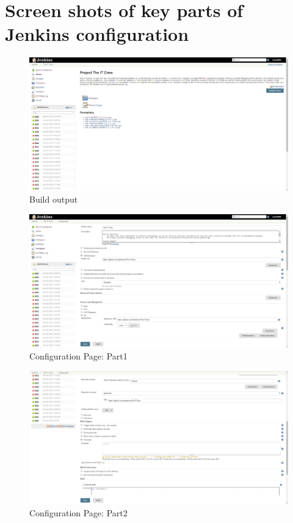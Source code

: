 \documentclass[UTF8]{article}
\begin{document}
\section{Screen shots of key parts of Jenkins configuration}
\begin{figure}[h]
  \includegraphics[width=\textwidth, height=\textheight,keepaspectratio]{JenkinsSetup0}
  \caption{Build output}
\end{figure}

\begin{figure}[h]
  \includegraphics[width=\textwidth, height=\textheight,keepaspectratio]{JenkinsSetup1}
  \caption{Configuration Page: Part1}
\end{figure}

\newpage
\begin{figure}[h]
  \includegraphics[width=\textwidth, height=\textheight,keepaspectratio]{JenkinsSetup2}
  \caption{Configuration Page: Part2}
\end{figure}
\end{document}
